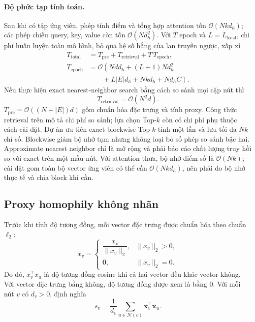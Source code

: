 \documentclass[12pt,a4paper]{article}
\numberwithin{equation}{section}
\theoremstyle{definition}
\begin{document}
\paragraph{Độ phức tạp tính toán.} Sau khi có tập ứng viên, phép tính điểm và tổng hợp attention tốn $\mathcal{O}(Nk d_h)$; các phép chiếu query, key, value còn tốn $\mathcal{O}(N d_h^2)$. Với $T$ epoch và $L=L_{\text{local}}$, chi phí huấn luyện toàn mô hình, bỏ qua hệ số hằng của lan truyền ngược, xấp xỉ
\begin{equation}
\begin{aligned}
T_{\text{total}} &= T_{\text{pre}} + T_{\text{retrieval}} + T\,T_{\text{epoch}},\\
T_{\text{epoch}} &= \mathcal{O}\!\left(N d d_h + (L+1)N d_h^2\right.\\
&\qquad\left.{}+ L|E|d_h + Nk d_h + N d_h C\right).
\end{aligned}
\end{equation}
Nếu thực hiện exact nearest-neighbor search bằng cách so sánh mọi cặp nút thì
\begin{equation}
T_{\text{retrieval}} = \mathcal{O}(N^2 d).
\end{equation}
$T_{\text{pre}}=\mathcal{O}((N+|E|)d)$ gồm chuẩn hóa đặc trưng và tính proxy. Công thức retrieval trên mô tả chi phí so sánh; lựa chọn Top-$k$ còn có chi phí phụ thuộc cách cài đặt. Dự án ưu tiên exact blockwise Top-$k$ tính một lần và lưu tối đa $Nk$ chỉ số. Blockwise giảm bộ nhớ tạm nhưng không loại bỏ số phép so sánh bậc hai. Approximate nearest neighbor chỉ là mở rộng và phải báo cáo chất lượng truy hồi so với exact trên một mẫu nút. Với attention thưa, bộ nhớ điểm số là $\mathcal{O}(Nk)$; cài đặt gom toàn bộ vector ứng viên có thể cần $\mathcal{O}(Nk d_h)$, nên phải đo bộ nhớ thực tế và chia block khi cần.

\subsection{Proxy homophily không nhãn}
Trước khi tính độ tương đồng, mỗi vector đặc trưng được chuẩn hóa theo
chuẩn $\ell_2$:
\[
\bar{x}_v =
\begin{cases}
\dfrac{x_v}{\|x_v\|_2}, & \|x_v\|_2>0,\\[4pt]
\mathbf{0}, & \|x_v\|_2=0.
\end{cases}
\]
Do đó, $\bar{x}_v^\top\bar{x}_u$ là độ tương đồng cosine khi cả hai vector
đều khác vector không. Với vector đặc trưng bằng không, độ tương đồng
được xem là bằng $0$. Với mỗi nút $v$ có $d_v>0$, định nghĩa
\begin{equation}
s_v = \frac{1}{d_v} \sum_{u \in \mathcal{N}(v)} \bar{\mathbf{x}}_v^\top \bar{\mathbf{x}}_u.
\end{equation}
\end{document}
